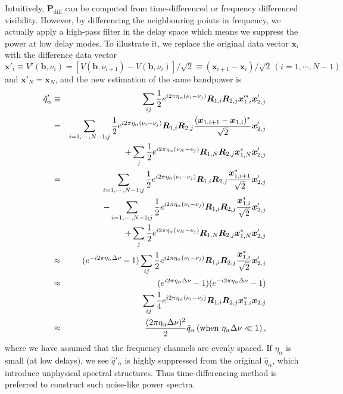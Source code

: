 \documentclass[12pt,a4paper]{article}
\begin{document}
Intuitively, $\bm{P}_\text{diff}$ can be computed from time-differenced or frequency differenced visibility. However, by differencing the neighbouring points in frequency, we actually apply a high-pass filter in the delay space which means we suppress the power at low delay modes. To illustrate it, we replace the original data vector $\bm{x}_i$ with the difference data vector $\bm{x}'_i \equiv V'(\bm{b},\nu_i) = \left[V(\bm{b},\nu_{i+1})-V(\bm{b},\nu_i)\right] / \sqrt{2} \equiv \left(\bm{x}_{i+1} - \bm{x}_i\right)/\sqrt{2}\, (i=1,\cdots,N-1)$ and $\bm{x}'_N = \bm{x}_N$, and the new estimation of the same bandpower is %
\begin{eqnarray}
    \hat{q}'_\alpha & \equiv & \sum_{ij}\frac{1}{2}e^{i2\pi\eta_\alpha(\nu_i - \nu_j)}\bm{R}_{1,i}\bm{R}_{2,j} \bm{x}'^*_{1,i} \bm{x}'_{2,j} \notag \\
    & = &\sum_{i=1,\cdots, N-1;j}\frac{1}{2}e^{i2\pi\eta_\alpha(\nu_i - \nu_j)} \bm{R}_{1,i}\bm{R}_{2,j} \frac{(\bm{x}_{1,i+1}-\bm{x}_{1,i})^*}{\sqrt{2}} \bm{x}'_{2,j} \notag \\
    & \phantom{=} & + \sum_{j} \frac{1}{2} e^{i2\pi\eta_\alpha(\nu_N - \nu_j)} \bm{R}_{1,N}\bm{R}_{2,j} \bm{x}_{1,N}^* \bm{x}'_{2,j} \notag \\
    & = & \sum_{i=1,\cdots, N-1;j}\frac{1}{2} e^{i2\pi\eta_\alpha(\nu_i - \nu_j)} \bm{R}_{1,i}\bm{R}_{2,j} \frac{\bm{x}^*_{1,i+1}}{\sqrt{2}} \bm{x}'_{2,j}\notag \\
    & \phantom{=} & - \sum_{i=1,\cdots, N-1;j}\frac{1}{2} e^{i2\pi\eta_\alpha(\nu_i - \nu_j)} \bm{R}_{1,i}\bm{R}_{2,j} \frac{\bm{x}^*_{1,i}}{\sqrt{2}} \bm{x}'_{2,j} \notag \\
    & \phantom{=} & + \sum_{j} \frac{1}{2} e^{i2\pi\eta_\alpha(\nu_N - \nu_j)} \bm{R}_{1,N}\bm{R}_{2,j} \bm{x}_{1,N}^* \bm{x}'_{2,j} \notag \\
    & \approx & (e^{-i2\pi\eta_\alpha \Delta\nu} -1 )\sum_{ij} \frac{1}{2} e^{i2\pi\eta_\alpha(\nu_i-\nu_j)} \bm{R}_{1,i}\bm{R}_{2,j} \frac{\bm{x}^*_{1,i}}{\sqrt{2}} \bm{x}'_{2,j} \notag \\
    & \approx & (e^{i2\pi\eta_\alpha \Delta\nu} -1 )(e^{-i2\pi\eta_\alpha \Delta\nu} -1 ) \notag \\
    & \phantom{=} &\sum_{ij} \frac{1}{4}e^{i2\pi\eta_\alpha(\nu_i-\nu_j)} \bm{R}_{1,i}\bm{R}_{2,j} \bm{x}^*_{1,i} \bm{x}_{2,j} \notag \\
    & \approx & \frac{(2\pi\eta_\alpha\Delta \nu)^2}{2} \hat{q}_\alpha \, (\text{when} \,\, \eta_\alpha \Delta\nu \ll 1)\,,
\end{eqnarray}
where we have assumed that the frequency channels are evenly spaced. If $\eta_\alpha$ is small (at low delays), we see $\hat{q}'_\alpha$ is highly suppressed from the original $\hat{q}_\alpha$, which introduce unphysical spectral structures. Thus time-differencing method is preferred to construct such noise-like power spectra.
\end{document}
